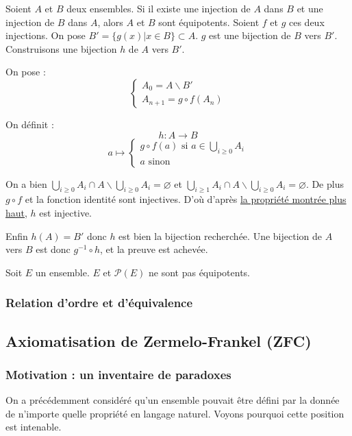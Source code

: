\begin{theoreme}
	Soient $A$ et $B$ deux ensembles. Si il existe une injection de $A$ dans $B$ et une injection de $B$ dans $A$, alors $A$ et $B$ sont équipotents.
	\tcblower
	Soient  $f$ et $g$ ces deux injections. On pose $B'= \{g(x)|x\in B\} \subset A$. $g$ est une bijection de $B$ vers $B'$. Construisons une bijection $h$ de $A$ vers $B'$. 

	On pose :
	$$\begin{cases}
		A_0 = A\backslash B' \\
		A_{n+1}=g\circ f(A_n)
	\end{cases}$$

	On définit :
	$$ h : A \to B$$
	$$a \mapsto \begin{cases}g \circ f(a) \text{ si } a \in \bigcup_{i\geq 0}A_i \\ a \text{ sinon}\end{cases}$$

	On a bien $\bigcup_{i\geq 0}A_i \cap A\backslash \bigcup_{i\geq 0}A_i=\varnothing$ et $\bigcup_{i\geq 1}A_i \cap A\backslash \bigcup_{i\geq 0}A_i = \varnothing$. De plus $g\circ f$ et la fonction identité sont injectives. D'où d'après \hyperref[recolle]{la propriété montrée plus haut}, $h$ est injective.

	Enfin $h(A)=B'$ donc $h$ est bien la bijection recherchée. Une bijection de $A$ vers $B$ est donc $g^{-1} \circ h$, et la preuve est achevée.
\end{theoreme}

\begin{theoreme}
	Soit $E$ un ensemble. $E$ et $\mathcal{P}(E)$ ne sont pas équipotents.
\end{theoreme}

\subsubsection{Relation d'ordre et d'équivalence}

\subsection{Axiomatisation de Zermelo-Frankel (ZFC)}
\subsubsection{Motivation : un inventaire de paradoxes}
On a précédemment considéré qu'un ensemble pouvait être défini par la donnée de n'importe quelle propriété en langage naturel. Voyons pourquoi cette position est intenable.

